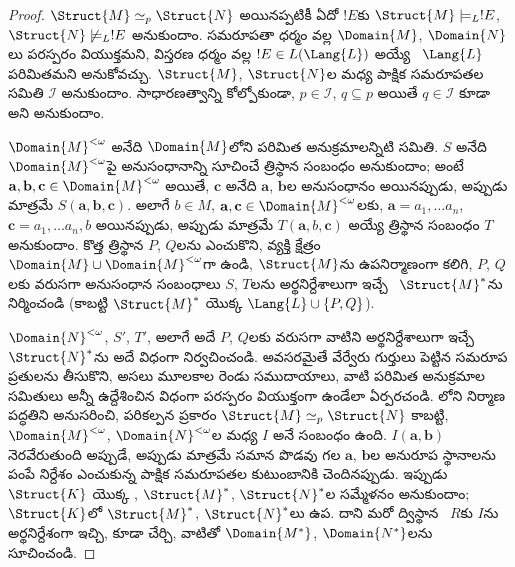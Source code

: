 \documentclass[../../../include/open-logic-section]{subfiles}
\begin{document}
\begin{proof}
$\Struct{M}\simeq_p\Struct{N}$ అయినప్పటికీ ఏదో $!E$కు
$\Struct{M}\models_L!E$, $\Struct{N}\not\models_L!E$ అనుకుందాం.
సమరూపతా ధర్మం వల్ల $\Domain{M}$, $\Domain{N}$లు పరస్పరం వియుక్తమని,
విస్తరణ ధర్మం వల్ల $!E\in L(\Lang{L})$ అయ్యే
~$\Lang{L}$ పరిమితమని అనుకోవచ్చు.
$\Struct{M}$, $\Struct{N}$ల మధ్య పాక్షిక సమరూపతల సమితి
$\mathcal{I}$ అనుకుందాం. సాధారణత్వాన్ని కోల్పోకుండా, $p\in\mathcal{I}$,
$q\subseteq p$ అయితే $q\in\mathcal{I}$ కూడా అని అనుకుందాం.

$\Domain{M}^{<\omega}$ అనేది $\Domain{M}$లోని
 పరిమిత అనుక్రమాలన్నిటి సమితి. $S$ అనేది
$\Domain{M}^{<\omega}$పై అనుసంధానాన్ని సూచించే త్రిస్థాన సంబంధం
అనుకుందాం; అంటే $\mathbf{a},\mathbf{b},\mathbf{c}\in
\Domain{M}^{<\omega}$ అయితే, $\mathbf{c}$ అనేది $\mathbf{a}$,
$\mathbf{b}$ల అనుసంధానం అయినప్పుడు, అప్పుడు మాత్రమే
$S(\mathbf{a},\mathbf{b},\mathbf{c})$. అలాగే $b\in M$,
$\mathbf{a},\mathbf{c}\in\Domain{M}^{<\omega}$లకు,
  $\mathbf{a}=a_1, \dots a_n$, $\mathbf{c}=a_1, \dots a_n,b$ అయినప్పుడు,
అప్పుడు మాత్రమే $T(\mathbf{a},b,\mathbf{c})$ అయ్యే త్రిస్థాన సంబంధం
$T$ అనుకుందాం. కొత్త త్రిస్థాన 
$P$, $Q$లను ఎంచుకొని, వ్యక్తి క్షేత్రం $\Domain{M}\cup
\Domain{M}^{<\omega}$గా ఉండి, $\Struct{M}$ను ఉపనిర్మాణంగా కలిగి, $P$,
$Q$లకు వరుసగా అనుసంధాన సంబంధాలు $S$, $T$లను అర్థనిర్దేశాలుగా ఇచ్చే
~$\Struct{M}^*$ను నిర్మించండి
(కాబట్టి $\Struct{M}^*$ యొక్క 
$\Lang{L}\cup\{P,Q\}$).

$\Domain{N}^{<\omega}$, $S'$, $T'$, అలాగే అదే $P$, $Q$లకు వరుసగా
వాటిని అర్థనిర్దేశాలుగా ఇచ్చే $\Struct{N}^*$ను అదే విధంగా
నిర్వచించండి.
అవసరమైతే వేర్వేరు గుర్తులు పెట్టిన సమరూప ప్రతులను తీసుకొని, అసలు మూలకాల
రెండు సముదాయాలు, వాటి పరిమిత అనుక్రమాల సమితులు అన్నీ ఉద్దేశించిన
విధంగా పరస్పరం వియుక్తంగా ఉండేలా ఏర్పరచండి.
%
%
%
%
%
%
%
లోని నిర్మాణ పద్ధతిని అనుసరించి,
పరికల్పన ప్రకారం $\Struct{M}\simeq_p\Struct{N}$ కాబట్టి,
$\Domain{M}^{<\omega}$, $\Domain{N}^{<\omega}$ల మధ్య $I$ అనే సంబంధం
ఉంది. $I(\mathbf{a},\mathbf{b})$ నెరవేరుతుంది అప్పుడే, అప్పుడు మాత్రమే సమాన పొడవు గల
$\mathbf{a}$, $\mathbf{b}$ల అనురూప స్థానాలను పంపే నిర్దేశం ఎంచుకున్న
పాక్షిక సమరూపతల కుటుంబానికి చెందినప్పుడు.
ఇప్పుడు ~$\Struct{K}$ యొక్క
, $\Struct{M}^*$,
$\Struct{N}^*$ల 
సమ్మేళనం అనుకుందాం; $\Struct{K}$లో $\Struct{M}^*$,
$\Struct{N}^*$లు ఉప\-. దాని
 మరో ద్విస్థాన
~$R$కు $I$ను అర్థనిర్దేశంగా
ఇచ్చి,  కూడా చేర్చి,
వాటితో  $\Domain{M^*}$,
$\Domain{N^*}$లను సూచించండి.


\end{proof}
\end{document}
